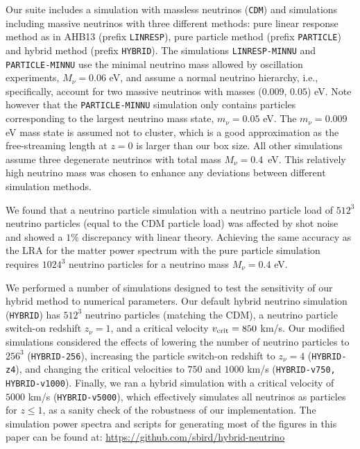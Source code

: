 \documentclass[useAMS, usenatbib]{mnras}
\begin{document}
Our suite includes a simulation with massless neutrinos (\texttt{CDM}) and simulations including massive neutrinos with three different methods: pure linear response method as in AHB13 (prefix \texttt{LINRESP}), pure particle method (prefix \texttt{PARTICLE}) and hybrid method (prefix \texttt{HYBRID}). The simulations \texttt{LINRESP-MINNU} and \texttt{PARTICLE-MINNU} use the minimal neutrino mass allowed by oscillation experiments, $M_\nu = 0.06$ eV, and assume a normal neutrino hierarchy, i.e., specifically, account for two massive neutrinos with masses ($0.009$, $0.05$) eV. Note however that the \texttt{PARTICLE-MINNU} simulation only contains particles corresponding to the largest neutrino mass state, $m_\nu = 0.05$ eV. The $m_\nu  = 0.009$ eV mass state is assumed not to cluster, which is a good approximation as the free-streaming length at $z=0$ is larger than our box size. All other simulations assume three degenerate neutrinos with total mass $M_\nu = 0.4$~eV. This relatively high neutrino mass was chosen to enhance any deviations between different simulation methods.

We found that a neutrino particle simulation with a neutrino particle load of $512^3$ neutrino particles (equal to the CDM particle load) was affected by shot noise and showed a $1\%$ discrepancy with linear theory. Achieving the same accuracy as the LRA for the matter power spectrum with the pure particle simulation requires $1024^3$ neutrino particles for a neutrino mass $M_\nu = 0.4$ eV.

We performed a number of simulations designed to test the sensitivity of our hybrid method to numerical parameters. Our default hybrid neutrino simulation (\texttt{HYBRID}) has $512^3$ neutrino particles (matching the CDM), a neutrino particle switch-on redshift $z_\nu = 1$, and a critical velocity $v_{\rm crit} = 850$ km/s. Our modified simulations considered the effects of lowering the number of neutrino particles to $256^3$ (\texttt{HYBRID-256}), increasing the particle switch-on redshift to $z_\nu = 4$ (\texttt{HYBRID-z4}), and changing the critical velocities to $750$ and $1000$ km/s (\texttt{HYBRID-v750, HYBRID-v1000}). Finally, we ran a hybrid simulation with a critical velocity of $5000$ km/s (\texttt{HYBRID-v5000}), which effectively simulates all neutrinos as particles for $z \leq 1$, as a sanity check of the robustness of our implementation.  The simulation power spectra and scripts for generating most of the figures in this paper can be found at: \url{https://github.com/sbird/hybrid-neutrino}
\end{document}
